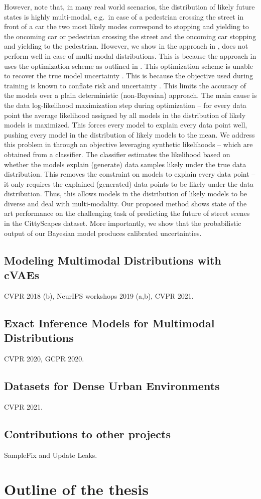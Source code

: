 However, note that, in many real world scenarios, the distribution of likely future states is highly multi-modal, e.g.\ in case of a pedestrian crossing the street in front of a car the two most likely modes correspond to stopping and yielding to the oncoming car or pedestrian crossing the street and the oncoming car stopping and yielding to the pedestrian. However, we show in \cite{BhattacharyyaFS19} the approach in \cite{BhattacharyyaFS18}, does not perform well in case of multi-modal distributions. This is because the approach in \cite{BhattacharyyaFS18} uses the optimization scheme as outlined in \cite{gal2016dropout,kendall2017uncertainties}. This optimization scheme is unable to recover the true model uncertainty \cite{osband2016risk}. This is because the objective used during training is known to conflate risk and uncertainty \citep{osband2016risk}. This limits the accuracy of the models over a plain deterministic (non-Bayesian) approach. The main cause is the data log-likelihood maximization step during optimization -- for every data point the average likelihood assigned by all models in the distribution of likely models is maximized. This forces every model to explain every data point well, pushing every model in the distribution of likely models  to the mean. We address this problem in  \cite{BhattacharyyaFS19} through an objective leveraging synthetic likelihoods \citep{wood2010statistical,rosca2017variational}  -- which are obtained from a classifier. The classifier estimates the likelihood based on whether the models explain (generate) data samples likely under the true data distribution. This removes the constraint on models to explain every data point -- it only requires the explained (generated) data points to be likely under the data distribution. Thus, this allows models in the distribution of likely models to be diverse and deal with multi-modality. Our proposed method shows state of the art performance on the challenging task of predicting the future of street scenes in the CittyScapes dataset. More importantly, we show that the probabilistic output of our Bayesian model produces calibrated uncertainties.

\subsection{Modeling Multimodal Distributions with cVAEs}  




CVPR 2018 (b), NeurIPS workshops 2019 (a,b), CVPR 2021.
\subsection{Exact Inference Models for Multimodal Distributions}  CVPR 2020, GCPR 2020. 
\subsection{Datasets for Dense Urban Environments}  CVPR 2021.
\subsection{Contributions to other projects}
SampleFix and Update Leaks.

\section{Outline of the thesis}
